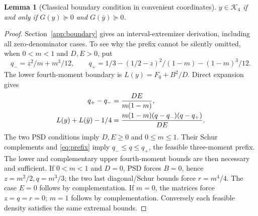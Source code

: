 \documentclass[pdflatex,sn-mathphys-num]{sn-jnl}
\theoremstyle{thmstyleone}
\newtheorem{lemma}[theorem]{Lemma}
\theoremstyle{thmstyletwo}\newtheorem{remark}[theorem]{Remark}
\newcommand{\K}{\mathcal K}
\begin{document}
\begin{lemma}[Classical boundary condition in convenient coordinates]\label{lem:G}
 $y\in\K_4$ if and only if $G(y)\succeq0$ and $G(\bar y)\succeq0$.
\end{lemma}
\begin{proof}
Section~\ref{app:boundary} gives an interval-extremizer derivation,
including all zero-denominator cases. To see why the prefix cannot be
silently omitted, when $0<m<1$ and $D,E>0$, put
\[
 q_- = z^2/m+m^3/12,\qquad
 q_+ =1/3-(1/2-z)^2/(1-m)-(1-m)^3/12.
\]
The lower fourth-moment boundary is
$L(y)=F_0+B^2/D$. Direct expansion gives
\begin{align}
 q_+-q_-&=\frac{DE}{m(1-m)},\notag\\
 L(y)+L(\bar y)-1/4
 &=\frac{m(1-m)(q-q_-)(q-q_+)}{DE}.\label{eq:prefix}
\end{align}
The two PSD conditions imply $D,E\ge0$ and $0\le m\le1$.
Their Schur complements and \eqref{eq:prefix} imply $q_-\le q\le q_+$,
the feasible three-moment prefix. The lower and complementary upper
fourth-moment bounds are then necessary and sufficient.
If $0<m<1$ and $D=0$, PSD forces $B=0$, hence
$z=m^2/2,q=m^3/3$; the two last diagonal/Schur bounds force $r=m^4/4$.
The case $E=0$ follows by complementation. If $m=0$, the matrices force
$z=q=r=0$; $m=1$ follows by complementation. Conversely each feasible
density satisfies the same extremal bounds.
\end{proof}
\end{document}
